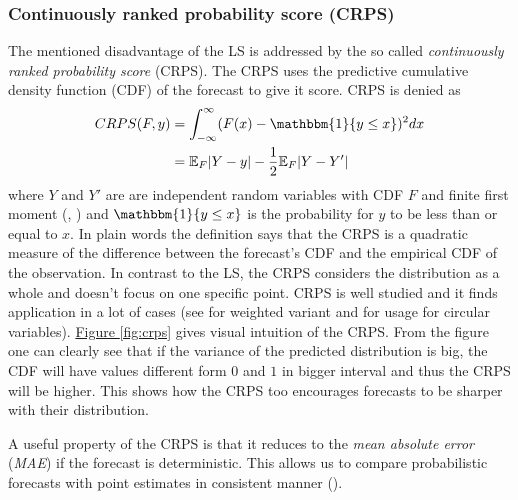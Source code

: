 \documentclass[12pt,a4paper,twoside]{scrartcl}
\numberwithin{equation}{section}
\newcommand{\reffig}[1]{\hyperref[#1]{Figure \ref*{#1}}}
\begin{document}
\subsubsection{Continuously ranked probability score (CRPS)}\label{sec:crps}
The mentioned disadvantage of the LS is addressed by the so called \emph{continuously ranked probability score} (CRPS). The CRPS uses the predictive cumulative density function (CDF) of the forecast to give it score. CRPS is denied as
\begin{align}
  \label{eq:crps}
  CRPS(F,y)  &= \int_{-\infty}^{\infty}(F(x) - \mathbbm{1}\{y \leq x \})^2dx \\
             &= \mathbb{E}_F|Y - y| - \frac{1}{2}\mathbb{E}_F|Y - Y'|
\end{align}
where \(Y\) and \(Y'\) are are independent random variables with CDF \(F\) and finite first moment (\cite{rafteryg2007}, \cite{matheson1976}) and \(\mathbbm{1}\{y \leq x \}\) is the probability for \(y\) to be less than or equal to \(x \). In plain words the definition says that the CRPS is a quadratic measure of the difference between the forecast's CDF and the empirical CDF of the observation. In contrast to the LS, the CRPS considers the distribution as a whole and doesn't focus on one specific point. CRPS is well studied and it finds application in a lot of cases (see \cite{ranjan2011} for weighted variant and \cite{grimit2007} for usage for circular variables). \reffig{fig:crps} gives visual intuition of the CRPS. From the figure one can clearly see that if the variance of the predicted distribution is big, the CDF will have values different form \(0\) and \(1\) in bigger interval and thus the CRPS will be higher. This shows how the CRPS too encourages forecasts to be sharper with their distribution.


A useful property of the CRPS is that it reduces to the \emph{mean absolute error} (\emph{MAE}) if the forecast is deterministic. This allows us to compare probabilistic forecasts with point estimates in consistent manner (\cite{gneiting2014}).
\end{document}
